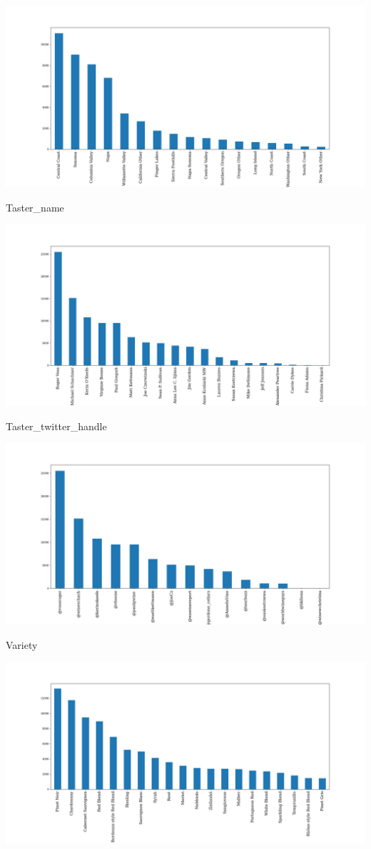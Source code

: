 \documentclass[11pt]{article}
\begin{document}
\includegraphics[width=\textwidth,height=\textheight,keepaspectratio]{figures/1c_histogram_of_region_2.png}

Taster\_name

\includegraphics[width=\textwidth,height=\textheight,keepaspectratio]{figures/1c_histogram_of_taster_name.png}

Taster\_twitter\_handle

\includegraphics[width=\textwidth,height=\textheight,keepaspectratio]{figures/1c_histogram_of_taster_twitter_handle.png}

Variety

\includegraphics[width=\textwidth,height=\textheight,keepaspectratio]{figures/1c_histogram_of_variety.png}
\end{document}

